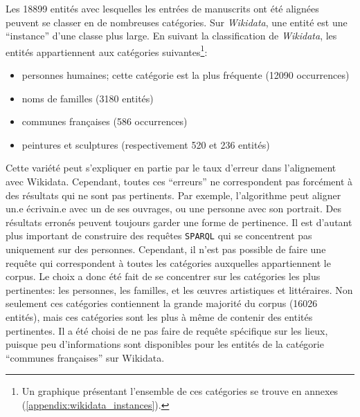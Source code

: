 \documentclass[a4paper, 12pt, twoside]{book}
\newcommand{\sparql}{\texttt{\gls{SPARQL}}}
\newcommand{\wkd}{\textit{Wikidata}}
\begin{document}
Les 18899 entités avec lesquelles les entrées de manuscrits ont été alignées peuvent se classer en de nombreuses catégories. Sur \wkd{}, une entité est une \enquote{instance} d'une classe plus large. En suivant la classification de \wkd{}, les entités appartiennent aux catégories suivantes\footnote{Un graphique présentant l'ensemble de ces catégories se trouve en annexes (\ref{appendix:wikidata_instances}).}:
\begin{itemize}
	\item personnes humaines; cette catégorie est la plus fréquente (12090 occurrences)
	\item noms de familles (3180 entités)
	\item communes françaises (586 occurrences)
	\item peintures et sculptures (respectivement 520 et 236 entités)
\end{itemize}

Cette variété peut s'expliquer en partie par le taux d'erreur dans l'alignement avec Wikidata. Cependant, toutes ces \enquote{erreurs} ne correspondent pas forcément à des résultats qui ne sont pas pertinents. Par exemple, l'algorithme peut aligner un.e écrivain.e avec un de ses ouvrages, ou une personne avec son portrait. Des résultats erronés peuvent toujours garder une forme de pertinence. Il est d'autant plus important de construire des requêtes \sparql{} qui se concentrent pas uniquement sur des personnes. Cependant, il n'est pas possible de faire une requête qui correspondent à toutes les catégories auxquelles appartiennent le corpus. Le choix a donc été fait de se concentrer sur les catégories les plus pertinentes: les personnes, les familles, et les œuvres artistiques et littéraires. Non seulement ces catégories contiennent la grande majorité du corpus (16026 entités), mais ces catégories sont les plus à même de contenir des entités pertinentes. Il a été choisi de ne pas faire de requête spécifique sur les lieux, puisque peu d'informations sont disponibles pour les entités de la catégorie \enquote{communes françaises} sur Wikidata.
\end{document}

